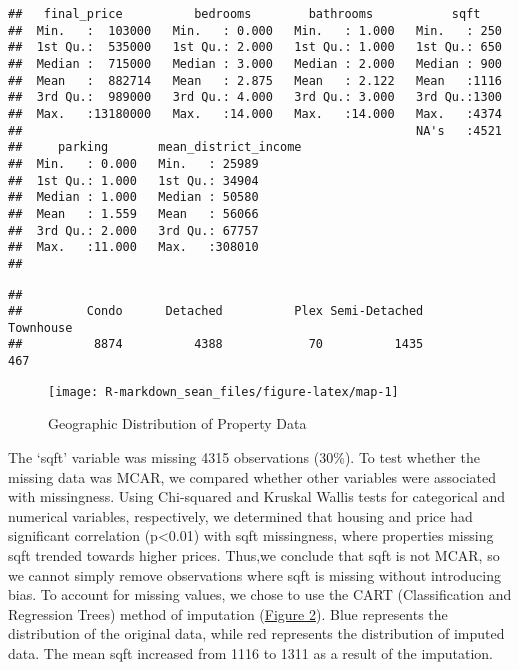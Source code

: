 \documentclass[11pt,]{article}
\begin{document}
\begin{verbatim}
##   final_price          bedrooms        bathrooms           sqft     
##  Min.   :  103000   Min.   : 0.000   Min.   : 1.000   Min.   : 250  
##  1st Qu.:  535000   1st Qu.: 2.000   1st Qu.: 1.000   1st Qu.: 650  
##  Median :  715000   Median : 3.000   Median : 2.000   Median : 900  
##  Mean   :  882714   Mean   : 2.875   Mean   : 2.122   Mean   :1116  
##  3rd Qu.:  989000   3rd Qu.: 4.000   3rd Qu.: 3.000   3rd Qu.:1300  
##  Max.   :13180000   Max.   :14.000   Max.   :14.000   Max.   :4374  
##                                                       NA's   :4521  
##     parking       mean_district_income
##  Min.   : 0.000   Min.   : 25989      
##  1st Qu.: 1.000   1st Qu.: 34904      
##  Median : 1.000   Median : 50580      
##  Mean   : 1.559   Mean   : 56066      
##  3rd Qu.: 2.000   3rd Qu.: 67757      
##  Max.   :11.000   Max.   :308010      
## 
\end{verbatim}

\begin{verbatim}
## 
##         Condo      Detached          Plex Semi-Detached     Townhouse 
##          8874          4388            70          1435           467
\end{verbatim}

\begin{figure}

{\centering \texttt{[image: R-markdown\_sean\_files/figure-latex/map-1]} 

}

\caption{Geographic Distribution of Property Data\label{sec:map}}\label{fig:map}
\end{figure}

The `sqft' variable was missing 4315 observations (30\%). To test
whether the missing data was MCAR, we compared whether other variables
were associated with missingness. Using Chi-squared and Kruskal Wallis
tests for categorical and numerical variables, respectively, we
determined that housing and price had significant correlation
(p\textless0.01) with sqft missingness, where properties missing sqft
trended towards higher prices. Thus,we conclude that sqft is not MCAR,
so we cannot simply remove observations where sqft is missing without
introducing bias. To account for missing values, we chose to use the
CART (Classification and Regression Trees) method of imputation
(\hyperref[sec:fig2]{Figure 2}). Blue represents the distribution of the
original data, while red represents the distribution of imputed data.
The mean sqft increased from 1116 to 1311 as a result of the imputation.
\end{document}
